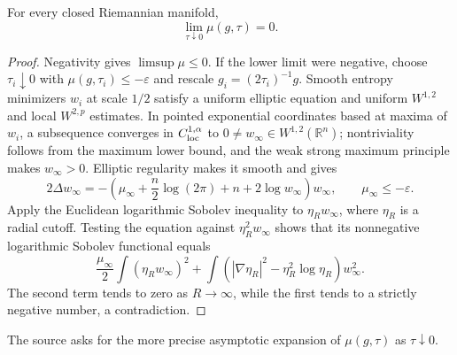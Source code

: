 \begin{proposition}
\label{prop:chow-iii-ch17-mu-small-scale-limit}
For every closed Riemannian manifold,
\[
 \lim_{\tau\downarrow0}\mu(g,\tau)=0.
\]
\end{proposition}
\begin{proof}
\sketch Negativity gives $\limsup\mu\le0$.  If the lower limit were negative, choose
$\tau_i\downarrow0$ with $\mu(g,\tau_i)\le-\varepsilon$ and rescale
$g_i=(2\tau_i)^{-1}g$.  Smooth entropy minimizers $w_i$ at scale $1/2$
satisfy a uniform elliptic equation and uniform $W^{1,2}$ and local
$W^{2,p}$ estimates.  In pointed exponential coordinates based at maxima of
$w_i$, a subsequence converges in $C^{1,\alpha}_{\rm loc}$ to
$0\ne w_\infty\in W^{1,2}(\mathbb R^n)$; nontriviality follows from the
maximum lower bound, and the weak strong maximum principle makes
$w_\infty>0$.  Elliptic regularity makes it smooth and gives
\[
 2\Delta w_\infty=-\left(\mu_\infty+\frac n2\log(2\pi)+n
 +2\log w_\infty\right)w_\infty,
 \qquad \mu_\infty\le-\varepsilon.
\]
Apply the Euclidean logarithmic Sobolev inequality to
$\eta_Rw_\infty$, where $\eta_R$ is a radial cutoff.  Testing the equation
against $\eta_R^2w_\infty$ shows that its nonnegative logarithmic Sobolev
functional equals
\[
 \frac{\mu_\infty}{2}\int(\eta_Rw_\infty)^2
 +\int(|\nabla\eta_R|^2-\eta_R^2\log\eta_R)w_\infty^2.
\]
The second term tends to zero as $R\to\infty$, while the first tends to a
strictly negative number, a contradiction.
\end{proof}

\begin{remark}
\label{rem:chow-iii-ch17-mu-small-scale-asymptotics-problem}
The source asks for the more precise asymptotic expansion of $\mu(g,\tau)$
as $\tau\downarrow0$.
\end{remark}


